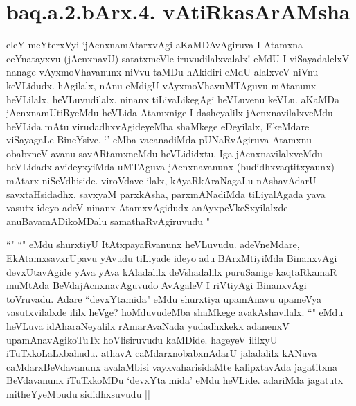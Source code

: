 \section*{baq.a.2.bArx.4. vAtiRkasArAMsha}


\begin{center}
\end{center}


\begin{artha}
eleY meYterxVyi `jAcnxnamAtarxvAgi aKaMDAvAgiruva I Atamxna ceYnatayxvu 
(jAcnxnavU) satatxmeVle iruvudilalxvalalx! eMdU I viSayadalelxV nanage 
vAyxmoVhavanunx niVvu taMDu hAkidiri eMdU alalxveV niVnu keVLidudx. hAgilalx, 
nAnu eMdigU vAyxmoVhavuMTAguvu mAtanunx heVLilalx, heVLuvudilalx. ninanx 
tiLivaLikegAgi heVLuvenu keVLu. aKaMDa jAcnxnamUtiRyeMdu heVLida Atamxnige I 
dasheyalilx jAcnxnavilalxveMdu heVLida mAtu virudadhxvAgideyeMba shaMkege 
eDeyilalx, EkeMdare viSayagaLe BineYsive. `\stext' eMba vacanadiMda 
pUNaRvAgiruva Atamxnu obabxneV avanu savARtamxneMdu heVLididxtu. Iga 
jAcnxnavilalxveMdu heVLidadx avideyxyiMda uMTAguva jAcnxnavanunx 
(budidhxvaqtitxyaunx) mAtarx niSeVdhiside. viroVdave ilalx, kAyaRkAraNagaLu 
nAshavAdarU savxtaHsidadhx, savxyaM parxkAsha, parxmANadiMda tiLiyalAgada yava 
vasutx ideyo adeV ninanx AtamxvAgidudx anAyxpeVkeSxyilalxde anuBavamADikoMDalu 
samathaRvAgiruvudu "
\end{artha}

\begin{artha}
``\stext"  ``\stext" eMdu shurxtiyU ItAtxpayaRvanunx heVLuvudu. adeVneMdare, 
EkAtamxsavxrUpavu yAvudu tiLiyade ideyo adu BArxMtiyiMda BinanxvAgi  
devxUtavAgide  yAva yAva kAladalilx deVshadalilx puruSanige kaqtaRkamaR muMtAda 
BeVdajAcnxnavAguvudo AvAgaleV I riVtiyAgi BinanxvAgi toVruvadu. Adare 
``devxYtamida" eMdu shurxtiya upamAnavu upameVya vasutxvilalxde ililx heVge? 
hoMduvudeMba shaMkege avakAshavilalx. ``\stext" eMdu heVLuva idAharaNeyalilx 
rAmarAvaNada yudadhxkekx adanenxV upamAnavAgikoTuTx hoVlisiruvudu kaMDide. 
hageyeV ililxyU iTuTxkoLaLxbahudu. athavA caMdarxnobabxnAdarU jaladalilx kANuva 
caMdarxBeVdavanunx avalaMbisi vayxvaharisidaMte kalipxtavAda jagatitxna 
BeVdavanunx iTuTxkoMDu `devxYta mida' eMdu heVLide. adariMda jagatutx 
mitheYyeMbudu sididhxsuvudu || 
\end{artha}

